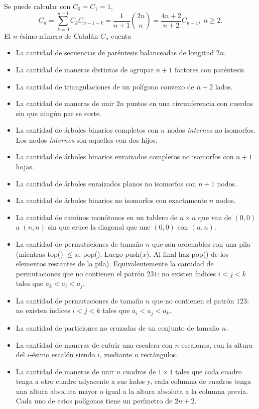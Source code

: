 Se puede calcular con $C_0 = C_1 = 1$,
$$C_n = \sum_{k = 0}^{n - 1} C_kC_{n - 1 - k} = \frac{1}{n + 1}\binom{2n}{n} = \frac{4n + 2}{n + 2}C_{n - 1},\; n \geq 2.$$
El $n$-ésimo número de Catalán $C_n$ cuenta
\begin{itemize}[noitemsep] %
    \item La cantidad de secuencias de paréntesis balanceadas de longitud $2n$.
    \item La cantidad de maneras distintas de agrupar $n + 1$ factores con paréntesis.
    \item La cantidad de triangulaciones de un polígono convexo de $n + 2$ lados.
    \item La cantidad de maneras de unir $2n$ puntos en una circunferencia con cuerdas sin que ningún par se corte.
    \item La cantidad de árboles binarios completos con $n$ nodos \textit{internos} no isomorfos. Los nodos \textit{internos} son aquellos con dos hijos.
    \item La cantidad de árboles binarios enraizados completos no isomorfos con $n + 1$ hojas.
    \item La cantidad de árboles enraizados planos no isomorfos con $n + 1$ nodos.
    \item La cantidad de árboles binarios no isomorfos con exactamente $n$ nodos.
    \item La cantidad de caminos monótonos en un tablero de $n \times n$ que van de $(0, 0)$ a $(n, n)$ sin que cruce la diagonal que une $(0, 0)$ con $(n, n)$.
    \item La cantidad de permutaciones de tamaño $n$ que son ordenables con una pila (mientras top() $\leq x$, pop(). Luego push($x$). Al final haz pop() de los elementos restantes de la pila). Equivalentemente la cantidad de permutaciones que no contienen el patrón $231$: no existen índices $i < j < k$ tales que $a_k < a_i < a_j$.
    \item La cantidad de permutaciones de tamaño $n$ que no contienen el patrón $123$: no existen índices $i < j < k$ tales que $a_i < a_j < a_k$.
    \item La cantidad de particiones no cruzadas de un conjunto de tamaño $n$.
    \item La cantidad de maneras de cubrir una escalera con $n$ escalones, con la altura del $i$-ésimo escalón siendo $i$, mediante $n$ rectángulos.
    \item La cantidad de maneras de unir $n$ cuadros de $1 \times 1$ tales que cada cuadro tenga a otro cuadro adyacente a sus lados y, cada columna de cuadros tenga una altura absoluta mayor o igual a la altura absoluta a la columna previa. Cada uno de estos polígonos tiene un perímetro de $2n + 2$.
\end{itemize}

